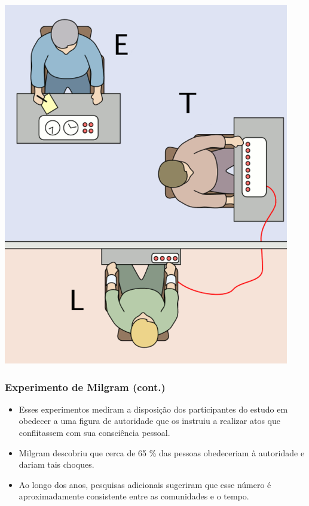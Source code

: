 \documentclass[11pt]{beamer}
\begin{document}
\begin{frame}
{}
{
\begin{center}
\includegraphics[width=\textwidth]{milgram.png}
\end{center}
}

\end{frame}


\begin{frame}
\frametitle{Experimento de Milgram (cont.)}

\begin{itemize}

\item Esses experimentos mediram a disposição dos participantes do estudo em obedecer a uma figura de autoridade que os instruiu a realizar atos que conflitassem com sua consciência pessoal.

\item Milgram descobriu que cerca de 65 \% das pessoas obedeceriam à autoridade e dariam tais choques.

\item Ao longo dos anos, pesquisas adicionais sugeriram que esse número é aproximadamente consistente entre as comunidades e o tempo.

\end{itemize}

\end{frame}
\end{document}
